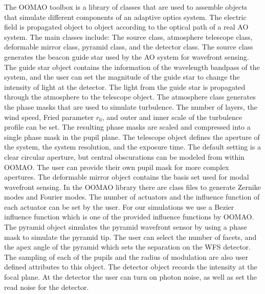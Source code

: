 The OOMAO toolbox is a library of classes that are used to assemble objects that simulate different components of an adaptive optics system. The electric field is propagated object to object according to the optical path of a real AO system. The main classes include: The source class, atmosphere telescope class, deformable mirror class, pyramid class, and the detector class. The source class generates the beacon guide star used by the AO system for wavefront sensing. The guide star object contains the information of the wavelength bandpass of the system, and the user can set the magnitude of the guide star to change the intensity of light at the detector. The light from the guide star is propagated through the atmosphere to the telescope object. The atmosphere class generates the phase masks that are used to simulate turbulence. The number of layers, the wind speed, Fried parameter $r_0$, and outer and inner scale of the turbulence profile can be set. The resulting phase masks are scaled and compressed into a single phase mask in the pupil plane.  The telescope object defines the aperture of the system, the system resolution, and the exposure time. The default setting is a clear circular aperture, but central obscurations can be modeled from within OOMAO. The user can provide their own pupil mask for more complex apertures. The deformable mirror object contains the basis set used for modal wavefront sensing. In the OOMAO library there are class files to generate Zernike modes and Fourier modes. The number of actuators and the influence function of each actuator can be set by the user. For our simulations we use a Bezier influence function which is one of the provided influence functions by OOMAO. The pyramid object simulates the pyramid wavefront sensor by using a phase mask to simulate the pyramid tip. The user can select the number of facets, and the apex angle of the pyramid which sets the separation on the WFS detector. The sampling of each of the pupils and the radius of modulation are also user defined attributes to this object. The detector object records the intensity at the focal plane. At the detector the user can turn on photon noise, as well as set the read noise for the detector. 



